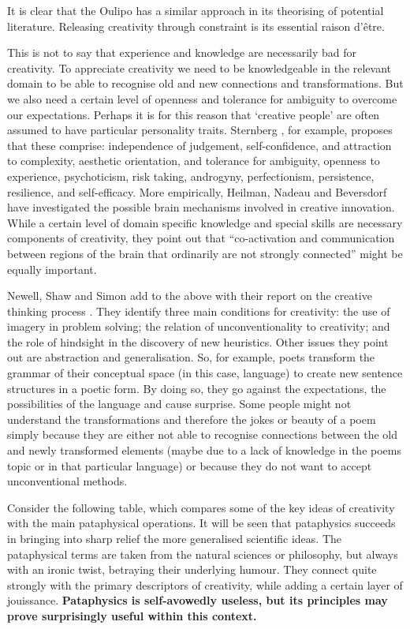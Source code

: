 It is clear that the Oulipo has a similar approach in its theorising of potential literature. Releasing creativity through constraint is its essential raison d'être.

This is not to say that experience and knowledge are necessarily bad for creativity. To appreciate creativity we need to be knowledgeable in the relevant domain to be able to recognise old and new connections and transformations. But we also need a certain level of openness and tolerance for ambiguity to overcome our expectations. Perhaps it is for this reason that `creative people' are often assumed to have particular personality traits. Sternberg \autocite{Sternberg1999, Sternberg1999}, for example, proposes that these comprise: independence of judgement, self-confidence, and attraction to complexity, aesthetic orientation, and tolerance for ambiguity, openness to experience, psychoticism, risk taking, androgyny, perfectionism, persistence, resilience, and self-efficacy. More empirically, Heilman, Nadeau and Beversdorf \autocite{Heilman2003} have investigated the possible brain mechanisms involved in creative innovation. While a certain level of domain specific knowledge and special skills are necessary components of creativity, they point out that ``co-activation and communication between regions of the brain that ordinarily are not strongly connected'' might be equally important.

Newell, Shaw and Simon add to the above with their report on the creative thinking process \autocite{Newell1963}. They identify three main conditions for creativity: the use of imagery in problem solving; the relation of unconventionality to creativity; and the role of hindsight in the discovery of new heuristics. Other issues they point out are abstraction and generalisation. So, for example, poets transform the grammar of their conceptual space (in this case, language) to create new sentence structures in a poetic form. By doing so, they go against the expectations, the possibilities of the language and cause surprise. Some people might not understand the transformations and therefore the jokes or beauty of a poem simply because they are either not able to recognise connections between the old and newly transformed elements (maybe due to a lack of knowledge in the poems topic or in that particular language) or because they do not want to accept unconventional methods.

Consider the following table, which compares some of the key ideas of creativity \autocite{Boden2003, Indurkhya, Koestler1964} with the main pataphysical operations. It will be seen that pataphysics succeeds in bringing into sharp relief the more generalised scientific ideas. The pataphysical terms are taken from the natural sciences or philosophy, but always with an ironic twist, betraying their underlying humour. They connect quite strongly with the primary descriptors of creativity, while adding a certain layer of jouissance. \textbf{Pataphysics is self-avowedly useless, but its principles may prove surprisingly useful within this context.}

